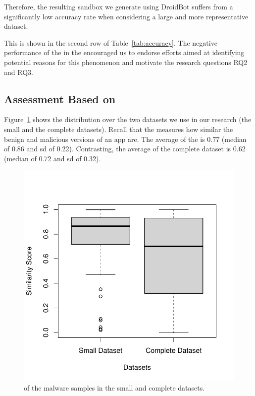 Therefore, the resulting sandbox we generate using
DroidBot suffers from a significantly low accuracy rate when considering a large and more representative dataset.

This is shown in the second row of Table~\ref{tab:accuracy}.
The negative performance of the \mas in the \cds encouraged us to endorse efforts aimed at identifying potential reasons for
this phenomenon and motivate the research questions RQ2 and RQ3. 



\subsection{Assessment Based on \sscore}

Figure~\ref{fig:ss} shows the \sscore distribution
over the two datasets we use in our research
(the small and the complete datasets).
Recall that the \sscore measures how similar the
benign and malicious versions of an app are.
The average \sscore of the
\sds is 0.77 (median of 0.86 and sd of 0.22). Contrasting,
the average \sscore of the complete dataset is
0.62 (median of 0.72 and sd of 0.32).

\begin{figure}
  \includegraphics[width=\columnwidth]{images/similarity-1.pdf}
  \caption{\sscore of the malware samples in the small and complete datasets.}
  \label{fig:ss}
\end{figure}

